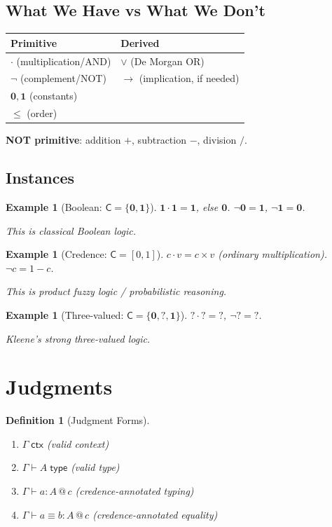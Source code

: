 \documentclass[11pt,a4paper]{article}
\makeatletter
\newtheorem{definition}{Definition}[section]
\newtheorem{example}[theorem]{Example}
\newcommand{\C}{\mathsf{C}}
\newcommand{\ctx}{\;\mathsf{ctx}}
\newcommand{\type}{\;\mathsf{type}}
\newcommand{\at}[1]{\,@\,#1}
\newcommand{\one}{\mathbf{1}}
\newcommand{\zero}{\mathbf{0}}
\newcommand{\negc}{\neg}
\makeatother
\begin{document}
\subsection{What We Have vs What We Don't}

\begin{center}
\begin{tabular}{l|l}
\textbf{Primitive} & \textbf{Derived} \\
\hline
$\cdot$ (multiplication/AND) & $\vee$ (De Morgan OR) \\
$\negc$ (complement/NOT) & $\to$ (implication, if needed) \\
$\zero, \one$ (constants) & \\
$\leq$ (order) &
\end{tabular}
\end{center}

\textbf{NOT primitive}: addition $+$, subtraction $-$, division $/$.

\subsection{Instances}

\begin{example}[Boolean: $\C = \{\zero, \one\}$]
$\one \cdot \one = \one$, else $\zero$. $\negc \zero = \one$, $\negc \one = \zero$.

This is classical Boolean logic.
\end{example}

\begin{example}[Credence: $\C = {[0,1]}$]
$c \cdot v = c \times v$ (ordinary multiplication). $\negc c = 1 - c$.

This is product fuzzy logic / probabilistic reasoning.
\end{example}

\begin{example}[Three-valued: $\C = \{\zero, ?, \one\}$]
$? \cdot ? = ?$, $\negc ? = ?$.

Kleene's strong three-valued logic.
\end{example}

\section{Judgments}

\begin{definition}[Judgment Forms]
\begin{enumerate}
    \item $\Gamma \ctx$ \hfill (valid context)
    \item $\Gamma \vdash A \type$ \hfill (valid type)
    \item $\Gamma \vdash a : A \at{c}$ \hfill (credence-annotated typing)
    \item $\Gamma \vdash a \equiv b : A \at{c}$ \hfill (credence-annotated equality)
\end{enumerate}
\end{definition}
\end{document}
